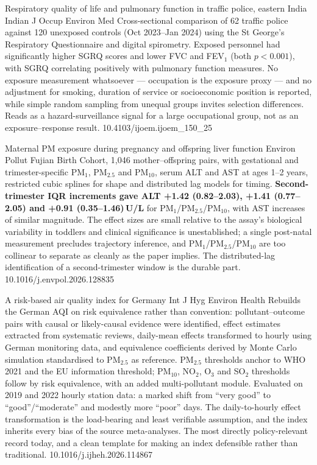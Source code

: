 \documentclass[10pt]{article}
\begin{document}
{Respiratory quality of life and pulmonary function in traffic police, eastern India}
{Indian J Occup Environ Med}
{Cross-sectional comparison of 62 traffic police against 120 unexposed controls
(Oct 2023--Jan 2024) using the St George's Respiratory Questionnaire and digital
spirometry. Exposed personnel had significantly higher SGRQ scores and lower FVC and
FEV$_1$ (both $p<0.001$), with SGRQ correlating positively with pulmonary function
measures. No exposure measurement whatsoever --- occupation is the exposure proxy --- and
no adjustment for smoking, duration of service or socioeconomic position is reported,
while simple random sampling from unequal groups invites selection differences. Reads as
a hazard-surveillance signal for a large occupational group, not as an exposure--response
result.}
{10.4103/ijoem.ijoem_150_25}


{Maternal PM exposure during pregnancy and offspring liver function}
{Environ Pollut}
{Fujian Birth Cohort, 1{,}046 mother--offspring pairs, with gestational and
trimester-specific PM$_1$, PM$_{2.5}$ and PM$_{10}$, serum ALT and AST at ages 1--2
years, restricted cubic splines for shape and distributed lag models for timing.
\textbf{Second-trimester IQR increments gave ALT +1.42 (0.82--2.03), +1.41 (0.77--2.05)
and +0.91 (0.35--1.46)\,U/L} for PM$_1$/PM$_{2.5}$/PM$_{10}$, with AST increases of
similar magnitude. The effect sizes are small relative to the assay's biological
variability in toddlers and clinical significance is unestablished; a single post-natal
measurement precludes trajectory inference, and PM$_1$/PM$_{2.5}$/PM$_{10}$ are too
collinear to separate as cleanly as the paper implies. The distributed-lag identification
of a second-trimester window is the durable part.}
{10.1016/j.envpol.2026.128835}


{A risk-based air quality index for Germany}
{Int J Hyg Environ Health}
{Rebuilds the German AQI on risk equivalence rather than convention: pollutant--outcome
pairs with causal or likely-causal evidence were identified, effect estimates extracted
from systematic reviews, daily-mean effects transformed to hourly using German monitoring
data, and equivalence coefficients derived by Monte Carlo simulation standardised to
PM$_{2.5}$ as reference. PM$_{2.5}$ thresholds anchor to WHO 2021 and the EU information
threshold; PM$_{10}$, NO$_2$, O$_3$ and SO$_2$ thresholds follow by risk equivalence,
with an added multi-pollutant module. Evaluated on 2019 and 2022 hourly station data: a
marked shift from ``very good'' to ``good''/``moderate'' and modestly more ``poor'' days.
The daily-to-hourly effect transformation is the load-bearing and least verifiable
assumption, and the index inherits every bias of the source meta-analyses. The most
directly policy-relevant record today, and a clean template for making an index
defensible rather than traditional.}
{10.1016/j.ijheh.2026.114867}
\end{document}
